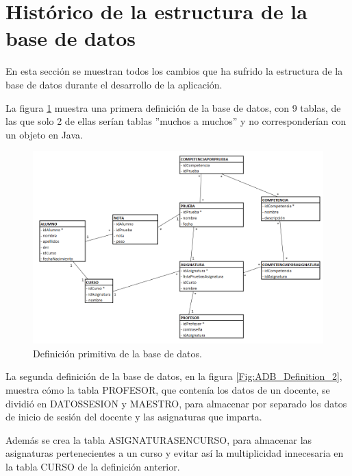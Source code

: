 \newpage

\section{Histórico de la estructura de la base de datos}
\label{ana:db}
En esta sección se muestran todos los cambios que ha sufrido la estructura de la base de datos durante el desarrollo de la aplicación.

La figura \ref{Fig:ADB_Definition_1} muestra una primera definición de la base de datos, con 9 tablas, de las que solo 2 de ellas serían tablas ''muchos a muchos'' y no corresponderían con un objeto en Java.

\begin{figure}[H]
\centering\includegraphics[width=1\linewidth]{figs/DB_Definition_1.png}
\caption{Definición primitiva de la base de datos.}
\label{Fig:ADB_Definition_1}
\end{figure}

\newpage
La segunda definición de la base de datos, en la figura \ref{Fig:ADB_Definition_2}, muestra cómo la tabla PROFESOR, que contenía los datos de un docente, se dividió en DATOSSESION y MAESTRO, para almacenar por separado los datos de inicio de sesión del docente y las asignaturas que imparta.

Además se crea la tabla ASIGNATURASENCURSO, para almacenar las asignaturas pertenecientes a un curso y evitar así la multiplicidad innecesaria en la tabla CURSO de la definición anterior.

